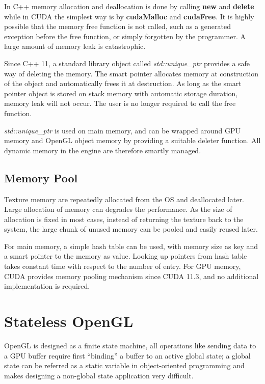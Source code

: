 \documentclass[oneside, a4paper]{report}
\begin{document}
    In C++ memory allocation and deallocation is done by calling \textbf{new} and \textbf{delete} while in CUDA the simplest way is by \textbf{cudaMalloc} and \textbf{cudaFree}. It is highly possible that the memory free function is not called, such as a generated exception before the free function, or simply forgotten by the programmer. A large amount of memory leak is catastrophic.

    Since C++ 11, a standard library object called \textit{std::unique\_ptr} provides a safe way of deleting the memory. The smart pointer allocates memory at construction of the object and automatically frees it at destruction. As long as the smart pointer object is stored on stack memory with automatic storage duration, memory leak will not occur. The user is no longer required to call the free function.

    \textit{std::unique\_ptr} is used on main memory, and can be wrapped around GPU memory and OpenGL object memory by providing a suitable deleter function. All dynamic memory in the engine are therefore smartly managed.

    \subsection{Memory Pool}

    Texture memory are repeatedly allocated from the OS and deallocated later. Large allocation of memory can degrades the performance. As the size of allocation is fixed in most cases, instead of returning the texture back to the system, the large chunk of unused memory can be pooled and easily reused later.

    For main memory, a simple hash table can be used, with memory size as key and a smart pointer to the memory as value. Looking up pointers from hash table takes constant time with respect to the number of entry. For GPU memory, CUDA provides memory pooling mechanism since CUDA 11.3, and no additional implementation is required.

    \section{Stateless OpenGL}

    OpenGL is designed as a finite state machine, all operations like sending data to a GPU buffer require first ``binding'' a buffer to an active global state; a global state can be referred as a static variable in object-oriented programming and makes designing a non-global state application very difficult.
\end{document}
